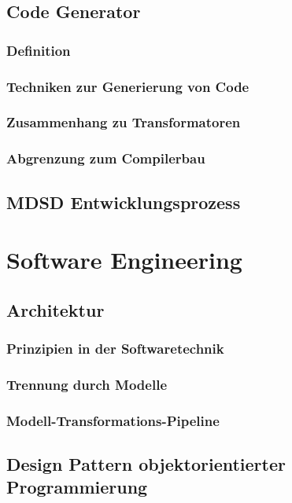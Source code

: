 \documentclass[12pt,oneside,a4paper,parskip]{scrbook}
\begin{document}
\subsection{Code Generator}

\subsubsection{Definition}
\subsubsection{Techniken zur Generierung von Code}
\subsubsection{Zusammenhang zu Transformatoren}
\subsubsection{Abgrenzung zum Compilerbau}
\subsection{MDSD Entwicklungsprozess}

\section{Software Engineering}

\subsection{Architektur}

\subsubsection{Prinzipien in der Softwaretechnik}
\subsubsection{Trennung durch Modelle}
\subsubsection{Modell-Transformations-Pipeline}

\subsection{Design Pattern objektorientierter Programmierung}
\end{document}
